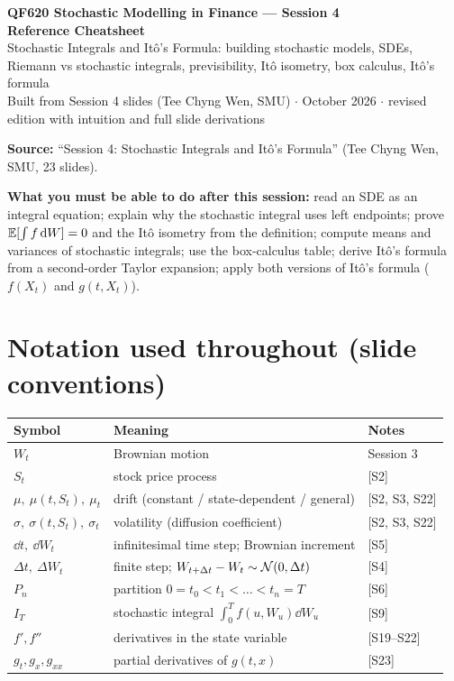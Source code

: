 \documentclass[10pt]{article}
\begin{document}
\begin{center}
{\LARGE\bfseries QF620 Stochastic Modelling in Finance --- Session 4\\[2pt] Reference Cheatsheet}\\[6pt]
{\large Stochastic Integrals and It\^o's Formula: building stochastic models, SDEs, Riemann vs stochastic integrals, previsibility, It\^o isometry, box calculus, It\^o's formula}\\[4pt]
{\small Built from Session 4 slides (Tee Chyng Wen, SMU) $\cdot$ October 2026 $\cdot$ revised edition with intuition and full slide derivations}
\end{center}
\tableofcontents
\vspace{4pt}
\textbf{Source:} ``Session 4: Stochastic Integrals and It\^o's Formula'' (Tee Chyng Wen, SMU, 23 slides).

\legend

\textbf{What you must be able to do after this session:} read an SDE as an integral equation; explain why the stochastic integral uses left endpoints; prove $\mathbb{E}[\int f\,\mathrm{d} W]=0$ and the It\^o isometry from the definition; compute means and variances of stochastic integrals; use the box-calculus table; derive It\^o's formula from a second-order Taylor expansion; apply both versions of It\^o's formula ($f(X_t)$ and $g(t,X_t)$).

\section*{Notation used throughout (slide conventions)}
{\small\renewcommand{\arraystretch}{1.12}
\begin{tabularx}{\linewidth}{@{}l X l@{}}\toprule
Symbol & Meaning & Notes\\\midrule
$W_t$ & Brownian motion & Session 3\\
$S_t$ & stock price process & [S2]\\
$\mu,\ \mu(t,S_t),\ \mu_t$ & drift (constant / state-dependent / general) & [S2, S3, S22]\\
$\sigma,\ \sigma(t,S_t),\ \sigma_t$ & volatility (diffusion coefficient) & [S2, S3, S22]\\
$\dd t,\ \dd W_t$ & infinitesimal time step; Brownian increment & [S5]\\
$\Delta t,\ \Delta W_t$ & finite step; $W_{t+\Delta t}-W_t\sim\mathcal{N}(0,\Delta t)$ & [S4]\\
$P_n$ & partition $0=t_0<t_1<\dots<t_n=T$ & [S6]\\
$I_T$ & stochastic integral $\int_0^Tf(u,W_u)\dd W_u$ & [S9]\\
$f',f''$ & derivatives in the state variable & [S19--S22]\\
$g_t,g_x,g_{xx}$ & partial derivatives of $g(t,x)$ & [S23]\\\bottomrule
\end{tabularx}}
\end{document}
